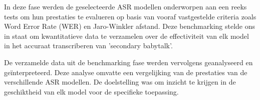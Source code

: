 In deze fase werden de geselecteerde ASR modellen onderworpen aan een reeks tests om hun prestaties te evalueren op basis van vooraf vastgestelde criteria zoals Word Error Rate (WER) en Jaro-Winkler afstand. Deze benchmarking stelde ons in staat om kwantitatieve data te verzamelen over de effectiviteit van elk model in het accuraat transcriberen van 'secondary babytalk'.

De verzamelde data uit de benchmarking fase werden vervolgens geanalyseerd en geïnterpreteerd. Deze analyse omvatte een vergelijking van de prestaties van de verschillende ASR modellen. De doelstelling was om inzicht te krijgen in de geschiktheid van elk model voor de specifieke toepassing.


